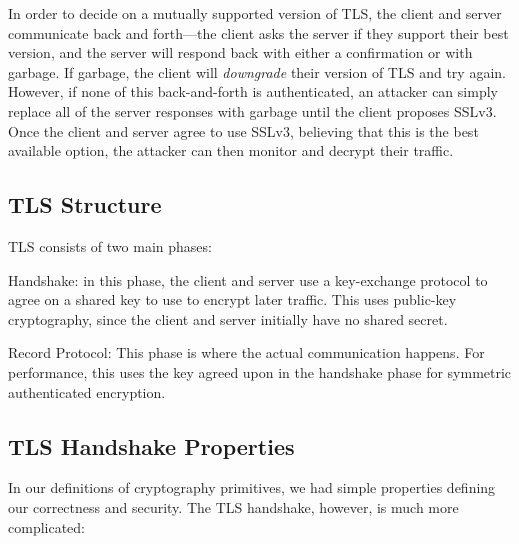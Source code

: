 In order to decide on a mutually supported version of TLS, the client and server communicate back and forth---the client asks the server if they support their best version, and the server will respond back with either a confirmation or with garbage. If garbage, the client will \emph{downgrade} their version of TLS and try again. However, if none of this back-and-forth is authenticated, an attacker can simply replace all of the server responses with garbage until the client proposes SSLv3. Once the client and server agree to use SSLv3, believing that this is the best available option, the attacker can then monitor and decrypt their traffic.

\subsection{TLS Structure}
TLS consists of two main phases:
\begin{compactenum}
\item Handshake: in this phase, the client and server use a key-exchange protocol to agree on a shared key to use to encrypt later traffic. This uses public-key cryptography, since the client and server initially have no shared secret.
\item Record Protocol: This phase is where the actual communication happens. For performance, this uses the key agreed upon in the handshake phase for symmetric authenticated encryption.
\end{compactenum}

\subsection{TLS Handshake Properties}
In our definitions of cryptography primitives, we had simple properties defining our correctness and security. The TLS handshake, however, is much more complicated:

